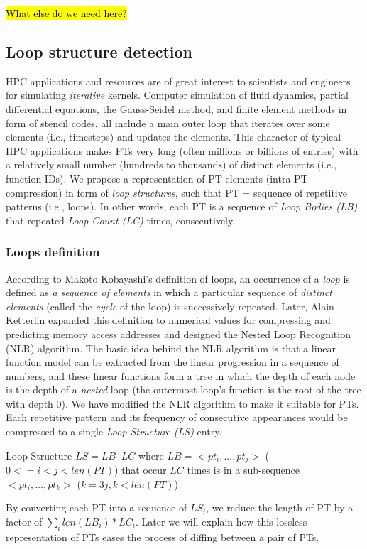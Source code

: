 \hl{What else do we need here?}

\subsection{Loop structure detection}
\label{subsec:nlr}

HPC applications and resources are of great interest to scientists and engineers for simulating \textit{iterative} kernels. Computer simulation of fluid dynamics, partial differential equations, the Gauss-Seidel method, and finite element methods in form of stencil codes, all include a main outer loop that iterates over some elements (i.e., timesteps) and updates the elements.
%
This character of typical HPC applications makes PTs very long (often millions or billions of entries) with a relatively small number (hundreds to thousands) of distinct elements (i.e., function IDs).
%
We propose a representation of PT elements (intra-PT compression) in form of \textit{loop structures}, such that PT = sequence of repetitive patterns (i.e., loops). In other words, each PT is a sequence of \textit{Loop Bodies (LB)} that repeated \textit{Loop Count (LC)} times, consecutively.
%


\subsubsection{Loops definition}

According to Makoto Kobayashi's \cite{kobayashi-84} definition of loops, an occurrence of a \textit{loop} is defined as \textit{a sequence of elements} in which a particular sequence of \textit{distinct elements} (called the \textit{cycle} of the loop) is successively repeated.
%
Later, Alain Ketterlin \cite{Ketterlin-nlr} expanded this definition to numerical values for compressing and predicting memory access addresses and designed the Nested Loop Recognition (NLR) algorithm.
%
The basic idea behind the NLR algorithm is that a linear function model can be extracted from the linear progression in a sequence of numbers, and these linear functions form a tree in which the depth of each node is the depth of a \textit{nested} loop (the outermost loop's function is the root of the tree with depth 0).
%
We have modified the NLR algorithm to make it suitable for PTs.
%
Each repetitive pattern and its frequency of consecutive appearances would be compressed to a single \textit{Loop Structure (LS)} entry.
%
\begin{definition}{Loop Structure} $LS = LB \; \hat{} \; LC$ where $LB  = <pt_i,...,pt_j>$ ($0 <= i < j < len(PT)$) that occur $LC$ times is in a sub-sequence $<pt_i,...,pt_k>$ ($k = 3j, k < len(PT)$)

\end{definition}
%
By converting each PT into a sequence of $LS_i$, we reduce the length of PT by a factor of $\sum_i len(LB_i) * LC_i$.
%
Later we will explain how this lossless representation of PTs eases the process of diffing between a pair of PTs.

